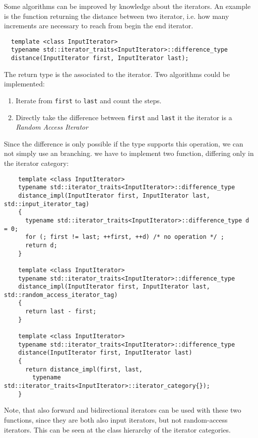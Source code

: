 \begin{example}
  Some algorithms can be improved by knowledge about the iterators. An example is the function  returning the distance
  between two iterator, i.e. how many increments are necessary to reach from begin the end iterator.
  \begin{verbatim}
  template <class InputIterator>
  typename std::iterator_traits<InputIterator>::difference_type
  distance(InputIterator first, InputIterator last);
  \end{verbatim}

  The return type is the  associated to the iterator. Two algorithms could be implemented:
  \begin{enumerate}
    \item Iterate from \texttt{first} to \texttt{last} and count the steps.
    \item Directly take the difference between \texttt{first} and \texttt{last} it the iterator is a \emph{Random Access Iterator}
  \end{enumerate}

  Since the difference is only possible if the type supports this operation, we can not simply use an  branching. we have
  to implement two function, differing only in the iterator category:
  \newpage
  \begin{verbatim}
    template <class InputIterator>
    typename std::iterator_traits<InputIterator>::difference_type
    distance_impl(InputIterator first, InputIterator last, std::input_iterator_tag)
    {
      typename std::iterator_traits<InputIterator>::difference_type d = 0;
      for (; first != last; ++first, ++d) /* no operation */ ;
      return d;
    }

    template <class InputIterator>
    typename std::iterator_traits<InputIterator>::difference_type
    distance_impl(InputIterator first, InputIterator last, std::random_access_iterator_tag)
    {
      return last - first;
    }

    template <class InputIterator>
    typename std::iterator_traits<InputIterator>::difference_type
    distance(InputIterator first, InputIterator last)
    {
      return distance_impl(first, last,
        typename std::iterator_traits<InputIterator>::iterator_category{});
    }
  \end{verbatim}

  Note, that also forward and bidirectional iterators can be used with these two functions, since they are both
  also input iterators, but not random-access iterators. This can be seen at the class hierarchy of the iterator
  categories.
\end{example}

